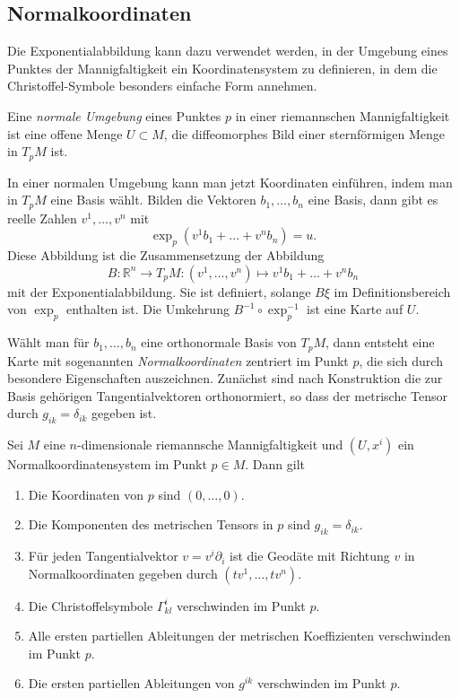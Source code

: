 %
%
\subsection{Normalkoordinaten}
Die Exponentialabbildung kann dazu verwendet werden, in der
Umgebung eines Punktes der Mannigfaltigkeit ein Koordinatensystem
zu definieren, in dem die Christoffel-Symbole besonders einfache
Form annehmen.

\begin{definition}
Eine \emph{normale Umgebung} eines Punktes $p$ in einer 
riemannschen Mannigfaltigkeit ist eine offene Menge $U\subset M$,
die diffeomorphes Bild einer sternförmigen Menge in $T_pM$ ist.
\end{definition}

In einer normalen Umgebung kann man jetzt Koordinaten einführen,
indem man in $T_pM$ eine Basis wählt.
Bilden die Vektoren $b_1,\dots,b_n$ eine Basis, dann gibt es reelle
Zahlen $v^1,\dots,v^n$ mit 
\[
\exp_p(v^1b_1+\dots+v^nb_n)=u.
\]
Diese Abbildung ist die Zusammensetzung der 
Abbildung
\[
B
\colon
\mathbb{R}^n \to T_pM
:
(v^1,\dots,v^n)
\mapsto
v^1b_1+\dots+v^nb_n
\]
mit der Exponentialabbildung.
Sie ist definiert, solange $B\xi$ im Definitionsbereich von $\exp_p$
enthalten ist.
Die Umkehrung $B^{-1}\circ\exp_p^{-1}$ ist eine Karte auf $U$.

Wählt man für $b_1,\dots,b_n$ eine orthonormale Basis von $T_pM$,
dann entsteht eine Karte mit sogenannten \emph{Normalkoordinaten}
zentriert im Punkt $p$,
die sich durch besondere Eigenschaften auszeichnen.
Zunächst sind nach Konstruktion die zur Basis gehörigen Tangentialvektoren
orthonormiert, so dass der metrische Tensor durch $g_{ik}=\delta_{ik}$
gegeben ist.

\begin{satz}
\label{zusammenhang:geodaeten:satz:normalkoordinaten}
Sei $M$ eine $n$-dimensionale riemannsche Mannigfaltigkeit und $(U,x^i)$
ein Normalkoordinatensystem im Punkt $p\in M$.
Dann gilt
\begin{enumerate}
\item Die Koordinaten von $p$  sind $(0,\dots,0)$.
\item Die Komponenten des metrischen Tensors in $p$ sind $g_{ik}=\delta_{ik}$.
\item Für jeden Tangentialvektor $v=v^i\partial_i$ ist die Geodäte mit
Richtung $v$ in Normalkoordinaten gegeben durch $(tv^1,\dots,tv^n)$.
\item Die Christoffelsymbole $\Gamma^i_{kl}$ verschwinden im Punkt $p$.
\item Alle ersten partiellen Ableitungen der metrischen Koeffizienten
verschwinden im Punkt $p$.
\item Die ersten partiellen Ableitungen von $g^{ik}$ verschwinden im Punkt $p$.
\end{enumerate}
\end{satz}

